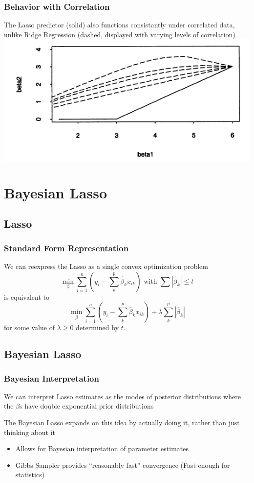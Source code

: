 \documentclass{beamer} %
\theoremstyle{definition}
\begin{document}
\begin{frame}
\frametitle{Behavior with Correlation}
The Lasso predictor (solid) also functions consistantly under correlated data, unlike Ridge Regression (dashed, displayed with varying levels of correlation)
\includegraphics[width=\textwidth]{correlation.png}
\end{frame}

\section{Bayesian Lasso}
\subsection{Lasso}
\begin{frame}
\frametitle{Standard Form Representation}
We can reexpress the Lasso as a single convex optimization problem
\[
\min_\beta \sum_{i=1}^n (y_i - \sum_k^p\hat\beta_k x_{ik} ) \text{ with } \sum |\hat\beta_k| \leq t
\]
is equivalent to
\[
\min_\beta \sum_{i=1}^n (y_i - \sum_k^p\hat\beta_k x_{ik} ) + \lambda \sum_k^p|\hat\beta_k|
\]
for some value of $\lambda \geq 0$ determined by $t$.
\end{frame}

\subsection{Bayesian Lasso}
\begin{frame}
\frametitle{Bayesian Interpretation}
We can interpret Lasso estimates as the modes of posterior distributions where the $\beta$s have double exponential prior distributions

The Bayesian Lasso expands on this idea by actually doing it, rather than just thinking about it

\begin{itemize}
\item Allows for Bayesian interpretation of parameter estimates
\item Gibbs Sampler provides ``reasonably fast'' convergence (Fast enough for statistics)
\end{itemize}
\end{frame}
\end{document}
